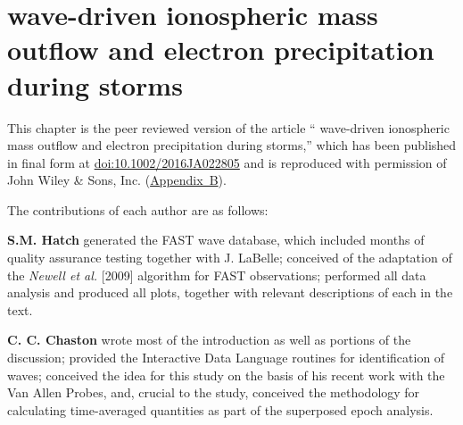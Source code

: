 
\chapter{\Alf wave-driven ionospheric mass outflow
and electron precipitation during storms}
\label{chp:2}

This chapter is the peer reviewed version of the article ``\Alf
wave-driven ionospheric mass outflow and electron precipitation during
storms,'' which has been published in final form at
\href{https://doi.org/10.1002/2016JA022805}{doi:10.1002/2016JA022805}
and is reproduced with permission of John Wiley \& Sons,
Inc. (\hyperref[app:B]{Appendix~B}).

The contributions of each author are as follows:

\textbf{S.M. Hatch} generated the FAST \Alf wave database, which
included months of quality assurance testing together with J. LaBelle;
conceived of the adaptation of the \textsl{Newell et al.} [2009]
algorithm for FAST observations; performed all data analysis and
produced all plots, together with relevant descriptions of each in the
text.

\textbf{C. C. Chaston} wrote most of the introduction as well as
portions of the discussion; provided the Interactive Data Language
routines for identification of \Alf waves; conceived the idea for this
study on the basis of his recent work with the Van Allen Probes, and,
crucial to the study, conceived the methodology for calculating
time-averaged quantities as part of the superposed epoch analysis.

